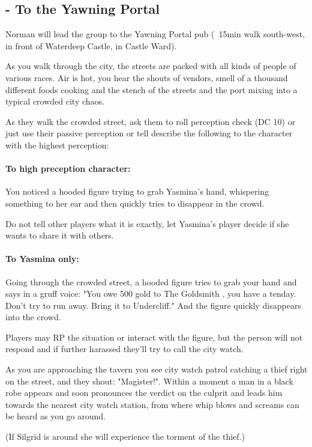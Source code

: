 \documentclass[10pt,onecolumn,twoside,openany,bg=full,layout=true]{dndbook}
\begin{document}
\subsection{ - To the Yawning Portal}\label{subsec:\arabic{subact_num}-to-the-yawning-portal}
\addtocounter{subact_num}{1}
Norman will lead the group to the Yawning Portal pub (~15min walk south-west, in front of Waterdeep Castle, in Castle Ward).
\begin{DndReadAloud}
As you walk through the city, the streets are packed with all kinds of people of various races.
Air is hot, you hear the shouts of vendors, smell of a thousand different foods cooking and the stench of the streets and the port mixing into a typical crowded city chaos.
\end{DndReadAloud}

As they walk the crowded street, ask them to roll perception check (DC 10) or just use their passive perception or
tell describe the following to the character with the highest perception:
\begin{DndReadAloud}
\paragraph{ To high preception character: }
  You noticed a hooded figure trying to grab Yasmina's hand, whispering something to her ear and then quickly tries to disappear in the crowd.
\end{DndReadAloud}
Do not tell other players what it is exactly, let Yasmina's player decide if she wants to share it with others.
\begin{DndReadAloud}
\paragraph{ To Yasmina only:}
Going through the crowded street, a hooded figure tries to grab your hand and says in a gruff voice:
"You owe 500 gold to The Goldsmith , you have a tenday.
  Don't try to run away.
  Bring it to Undercliff."
  And the figure quickly disappears into the crowd.
\end{DndReadAloud}
Players may RP the situation or interact with the figure, but the person will not respond and if further harassed they'll try to call the city watch.

\begin{DndReadAloud}
As you are approaching the tavern you see city watch patrol catching a thief right on the street, and they shout: "Magister!".
Within a moment a man in a black robe appears and soon pronounces the verdict on the culprit and leads him towards the
nearest city watch station, from where whip blows and screams can be heard as you go around.
\end{DndReadAloud}
(If Silgrid is around she will experience the torment of the thief.)
\end{document}
